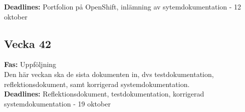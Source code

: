 \documentclass{TDP003mall}
\begin{document}
\textbf{Deadlines:} Portfolion på OpenShift, inlämning av sytemdokumentation - 12 oktober


\subsection*{Vecka 42}

\textbf{Fas:} Uppföljning\\

Den här veckan ska de sista dokumenten in, dvs testdokumentation, reflektionsdokument, samt korrigerad systemdokumentation.\\


\textbf{Deadlines:} Reflektionsdokument, testdokumentation, korrigerad systemdokumentation - 19 oktober
\end{document}
